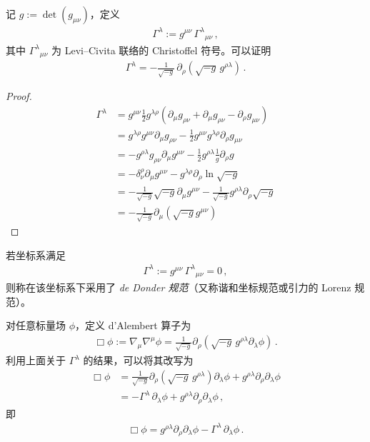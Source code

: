 记 $g := \det(g_{\mu\nu})$，定义
\begin{align}
\Gamma^{\lambda} := g^{\mu\nu}\,\Gamma^{\lambda}{}_{\mu\nu}\,,
\end{align}
其中 $\Gamma^{\lambda}{}_{\mu\nu}$ 为 Levi--Civita 联络的 Christoffel 符号。可以证明
\begin{align}
\Gamma^{\lambda}
=
-\frac{1}{\sqrt{-g}}\,
\partial_{\rho}
\left(
  \sqrt{-g}\,g^{\rho\lambda}
\right)\,.
\end{align}
\begin{proof}
    
\begin{align}
\Gamma^{\lambda} &= g^{\mu\nu} \frac{1}{2} g^{\lambda\rho} \left( \partial_{\mu} g_{\rho\nu} + \partial_{\mu} g_{\rho\nu} - \partial_{\rho} g_{\mu\nu} \right) \\
&= g^{\lambda\rho} g^{\mu\nu} \partial_{\mu} g_{\rho\nu} - \frac{1}{2} g^{\mu\nu} g^{\lambda\rho} \partial_{\rho} g_{\mu\nu} \\
&= - g^{\rho\lambda} g_{\rho\nu} \partial_{\mu} g^{\mu\nu} - \frac{1}{2} g^{\rho\lambda} \frac{1}{g} \partial_{\rho} g \\
&= - \delta^{\rho}_{\nu} \partial_{\mu} g^{\mu\nu} - g^{\lambda\rho} \partial_{\rho} \ln \sqrt{-g} \\
&= - \frac{1}{\sqrt{-g}} \sqrt{-g} \partial_{\mu} g^{\mu\nu} - \frac{1}{\sqrt{-g}} g^{\rho\lambda} \partial_{\rho} \sqrt{-g} \\
&= - \frac{1}{\sqrt{-g}} \partial_{\mu} (\sqrt{-g} g^{\mu\nu})
\end{align}

\end{proof}


\begin{definition}[de Donder 规范]
    若坐标系满足
    \begin{align}
        \Gamma^{\lambda} := g^{\mu\nu}\,\Gamma^{\lambda}{}_{\mu\nu} = 0\,,
    \end{align}
    则称在该坐标系下采用了 \emph{de Donder 规范}（又称谐和坐标规范或引力的 Lorenz 规范）。
\end{definition}

对任意标量场 $\phi$，定义 d'Alembert 算子为
\begin{align}
\Box\phi
:=
\nabla_{\mu}\nabla^{\mu}\phi
=
\frac{1}{\sqrt{-g}}
\partial_{\rho}
\left(
  \sqrt{-g}\,
  g^{\rho\lambda}
  \partial_{\lambda}\phi
\right)\,.
\end{align}
利用上面关于 $\Gamma^{\lambda}$ 的结果，可以将其改写为
\begin{align}
\Box\phi
&=
\frac{1}{\sqrt{-g}}
\partial_{\rho}
\left(
  \sqrt{-g}\,
  g^{\rho\lambda}
\right)\partial_{\lambda}\phi
+
g^{\rho\lambda}\partial_{\rho}\partial_{\lambda}\phi
\\[0.3em]
&=
-\Gamma^{\lambda}\,\partial_{\lambda}\phi
+
g^{\rho\lambda}\partial_{\rho}\partial_{\lambda}\phi\,,
\end{align}
即
\begin{align}
\Box\phi
=
g^{\rho\lambda}\partial_{\rho}\partial_{\lambda}\phi
-
\Gamma^{\lambda}\,\partial_{\lambda}\phi\,.
\end{align}

